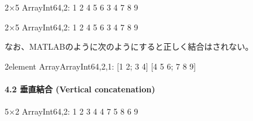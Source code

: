 \documentclass[letterpaper,10pt,english]{sphinxmanual}
\begin{document}
\begin{sphinxVerbatim}[commandchars=\\\{\}]
  
\end{sphinxVerbatim}

\begin{sphinxVerbatim}[commandchars=\\\{\}]
2×5 Array\PYGZob{}Int64,2\PYGZcb{}:
 1  2  4  5  6
 3  4  7  8  9
\end{sphinxVerbatim}

\begin{sphinxVerbatim}[commandchars=\\\{\}]
  \PYG{p}{[} \PYG{p}{]}
\end{sphinxVerbatim}

\begin{sphinxVerbatim}[commandchars=\\\{\}]
2×5 Array\PYGZob{}Int64,2\PYGZcb{}:
 1  2  4  5  6
 3  4  7  8  9
\end{sphinxVerbatim}

なお、MATLABのように次のようにすると正しく結合はされない。

\begin{sphinxVerbatim}[commandchars=\\\{\}]
  \PYG{p}{[} \PYG{p}{]}
\end{sphinxVerbatim}

\begin{sphinxVerbatim}[commandchars=\\\{\}]
2\PYGZhy{}element Array\PYGZob{}Array\PYGZob{}Int64,2\PYGZcb{},1\PYGZcb{}:
 [1 2; 3 4]
 [4 5 6; 7 8 9]
\end{sphinxVerbatim}


\paragraph{4.2 垂直結合 (Vertical concatenation)}
\label{\detokenize{tips:vertical-concatenation}}
\begin{sphinxVerbatim}[commandchars=\\\{\}]
   
\end{sphinxVerbatim}

\begin{sphinxVerbatim}[commandchars=\\\{\}]
5×2 Array\PYGZob{}Int64,2\PYGZcb{}:
 1  2
 3  4
 4  7
 5  8
 6  9
\end{sphinxVerbatim}
\end{document}

